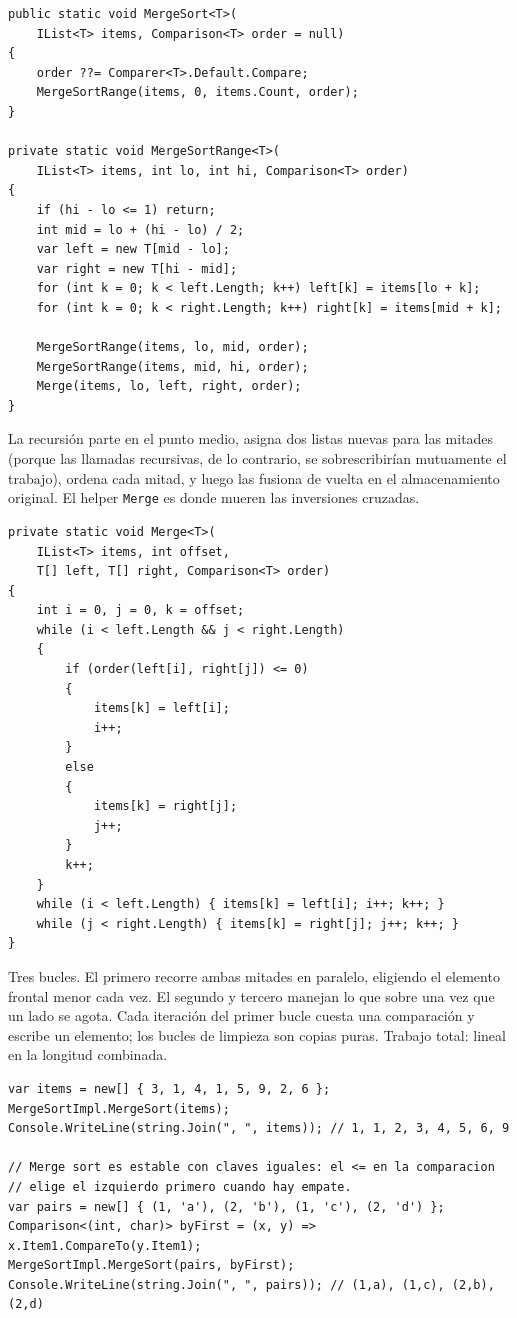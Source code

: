 \documentclass[11pt,a4paper]{article}
\begin{document}
\begin{lstlisting}[caption={Merge sort}]
public static void MergeSort<T>(
    IList<T> items, Comparison<T> order = null)
{
    order ??= Comparer<T>.Default.Compare;
    MergeSortRange(items, 0, items.Count, order);
}

private static void MergeSortRange<T>(
    IList<T> items, int lo, int hi, Comparison<T> order)
{
    if (hi - lo <= 1) return;
    int mid = lo + (hi - lo) / 2;
    var left = new T[mid - lo];
    var right = new T[hi - mid];
    for (int k = 0; k < left.Length; k++) left[k] = items[lo + k];
    for (int k = 0; k < right.Length; k++) right[k] = items[mid + k];

    MergeSortRange(items, lo, mid, order);
    MergeSortRange(items, mid, hi, order);
    Merge(items, lo, left, right, order);
}
\end{lstlisting}

La recursión parte en el punto medio, asigna dos listas nuevas para las mitades (porque las llamadas recursivas, de lo contrario, se sobrescribirían mutuamente el trabajo), ordena cada mitad, y luego las fusiona de vuelta en el almacenamiento original. El helper \texttt{Merge} es donde mueren las inversiones cruzadas.

\begin{lstlisting}[caption={\texttt{Merge}: entrelaza dos mitades ordenadas}]
private static void Merge<T>(
    IList<T> items, int offset,
    T[] left, T[] right, Comparison<T> order)
{
    int i = 0, j = 0, k = offset;
    while (i < left.Length && j < right.Length)
    {
        if (order(left[i], right[j]) <= 0)
        {
            items[k] = left[i];
            i++;
        }
        else
        {
            items[k] = right[j];
            j++;
        }
        k++;
    }
    while (i < left.Length) { items[k] = left[i]; i++; k++; }
    while (j < right.Length) { items[k] = right[j]; j++; k++; }
}
\end{lstlisting}

Tres bucles. El primero recorre ambas mitades en paralelo, eligiendo el elemento frontal menor cada vez. El segundo y tercero manejan lo que sobre una vez que un lado se agota. Cada iteración del primer bucle cuesta una comparación y escribe un elemento; los bucles de limpieza son copias puras. Trabajo total: lineal en la longitud combinada.

\begin{lstlisting}
var items = new[] { 3, 1, 4, 1, 5, 9, 2, 6 };
MergeSortImpl.MergeSort(items);
Console.WriteLine(string.Join(", ", items)); // 1, 1, 2, 3, 4, 5, 6, 9

// Merge sort es estable con claves iguales: el <= en la comparacion
// elige el izquierdo primero cuando hay empate.
var pairs = new[] { (1, 'a'), (2, 'b'), (1, 'c'), (2, 'd') };
Comparison<(int, char)> byFirst = (x, y) => x.Item1.CompareTo(y.Item1);
MergeSortImpl.MergeSort(pairs, byFirst);
Console.WriteLine(string.Join(", ", pairs)); // (1,a), (1,c), (2,b), (2,d)
\end{lstlisting}
\end{document}
